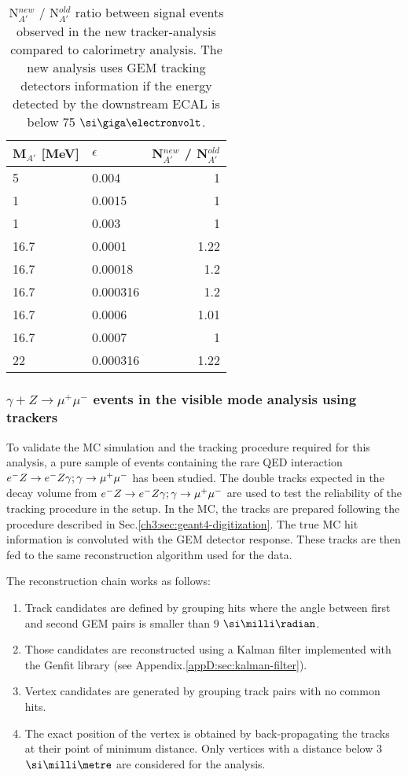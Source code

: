 \begin{table}[h!]
  \centering
  \begin{tabular}{|llr|}
    \hline
    M$_{A'}$ [MeV]& $\epsilon$ & N$^{new}_{A'}$ / N$^{old}_{A'}$ \\    
    \hline
    5    & 0.004    & 1   \\    
    1    & 0.0015   & 1   \\    
    1    & 0.003    & 1   \\    
    16.7 & 0.0001   & 1.22\\
    16.7 & 0.00018  & 1.2 \\    
    16.7 & 0.000316 & 1.2 \\
    16.7 & 0.0006   & 1.01\\
    16.7 & 0.0007   & 1   \\
    22   & 0.000316 & 1.22\\
    \hline    
  \end{tabular}
  \caption[ratio between signal events observed in tracker-analysis compared to calorimeter-only analysis]{N$^{new}_{A'}$ / N$^{old}_{A'}$ ratio between signal events observed in the new tracker-analysis compared to calorimetry analysis. The new analysis uses GEM tracking detectors information if the energy detected by the downstream ECAL is below 75 $\gev$.}
  \label{tab:dm:efftable}
\end{table}

\subsubsection{$\gamma + Z \rightarrow \mu^+ \mu^-$ events in the visible mode analysis using trackers}
\label{ch3:sec:vis-mode-tracking-dimuon}

To validate the MC simulation and the tracking procedure required for this analysis, a pure sample of events containing the rare QED interaction $e^- Z \to e^- Z \gamma; \gamma \to \mu^+ \mu^-$ has been studied. The double tracks expected in the decay volume from $e^- Z \to e^- Z \gamma; \gamma \to \mu^+ \mu^-$ are used to test the reliability of the tracking procedure in the setup. In the MC, the tracks are prepared following the procedure described in Sec.\ref{ch3:sec:geant4-digitization}. The true MC hit information is convoluted with the GEM detector response. These tracks are then fed to the same reconstruction algorithm used for the data.

The reconstruction chain works as follows:
\begin{enumerate}
\item Track candidates are defined by grouping hits where the angle between first and second GEM pairs is smaller than 9 $\mrad$.
\item Those candidates are reconstructed using a Kalman filter implemented with the Genfit library \cite{genfit} (see Appendix.\ref{appD:sec:kalman-filter}).
\item Vertex candidates are generated by grouping track pairs with no common hits.
\item The exact position of the vertex is obtained by back-propagating the tracks at their point of minimum distance. Only vertices with a distance below 3 $\mmi$ are considered for the analysis.
\end{enumerate}

